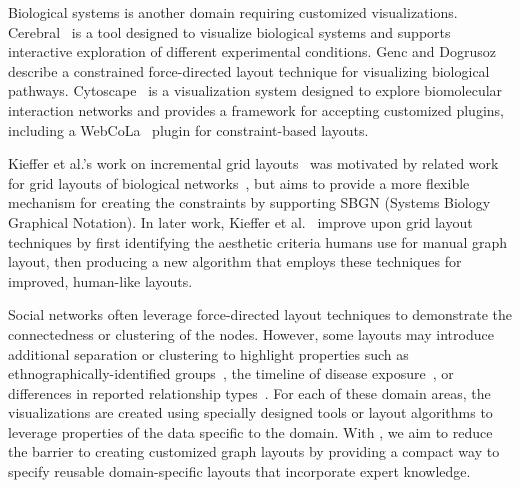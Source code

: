 Biological systems is another domain requiring customized visualizations.
Cerebral~\cite{barsky2008cerebral} is a tool designed to visualize
biological systems and supports interactive exploration of different
experimental conditions. Genc and Dogrusoz~\cite{genc2003constrained}
describe a constrained force-directed layout technique for visualizing 
biological pathways. Cytoscape~\cite{shannon2003cytoscape} is a
visualization system designed to explore biomolecular interaction networks
and provides a framework for accepting customized plugins, including 
a WebCoLa~\cite{WebCoLa} plugin for constraint-based layouts. 

Kieffer et al.'s work on incremental grid layouts~\cite{kieffer2013incremental}
was motivated by related work for grid layouts of biological 
networks~\cite{barsky2008cerebral,kojima2007efficient,li2005grid}, 
but aims to provide a more flexible mechanism for creating the constraints 
by supporting SBGN (Systems Biology Graphical Notation). In later
work, Kieffer et al.~\cite{kieffer2016hola} improve upon grid layout techniques
by first identifying the aesthetic criteria humans use for manual graph layout,
then producing a new algorithm that employs these techniques for improved,
human-like layouts.

Social networks often leverage force-directed layout techniques
to demonstrate the connectedness or clustering of the nodes. However, some
layouts may introduce additional separation or clustering
to highlight properties such as ethnographically-identified groups~\cite{rothenberg1998using},
the timeline of disease
exposure~\cite{fitzpatrick2001preventable,mcelroy2003network},
or differences in reported relationship types~\cite{fu2011hiv}.
For each of these domain areas, the visualizations are created using specially
designed tools or layout algorithms to leverage properties of the data
specific to the domain. With \projectname, we aim to reduce the barrier to
creating customized graph layouts by providing a compact way to specify
reusable domain-specific layouts that incorporate expert knowledge.





